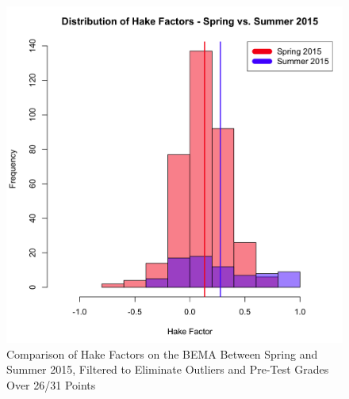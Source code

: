 \begin{figure}[!htb]
	\centering
	\includegraphics[width=6in]{img/chapter4/hake_spring_vs_summer_filtered}
	\caption[Comparison of Hake Factors on the BEMA Between Spring and Summer 2015, Filtered to Eliminate Outliers and Pre-Test Grades Over 26/31 Points ]{Comparison of Hake Factors on the BEMA Between Spring and Summer 2015, Filtered to Eliminate Outliers and Pre-Test Grades Over 26/31 Points}
  \label{fig:hakeFiltered}
\end{figure}

